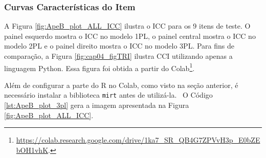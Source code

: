 \subsubsection{Curvas Características do Item}\label{sec:apeB_cci}

A Figura \ref{fig:ApeB_plot_ALL_ICC} ilustra o ICC para os 9 itens de teste. O painel esquerdo mostra o ICC no modelo 1PL, o painel central mostra o ICC no modelo 2PL e o painel direito mostra o ICC no modelo 3PL.  Para fins de comparação, a Figura \ref{fig:cap04_figTRI} ilustra CCI utilizando apenas a linguagem Python. Essa figura foi obtida a partir do Colab\footnote{\url{https://colab.research.google.com/drive/1ka7_SR_QB4G7ZPVvH3p_E0bZEbOH1vhK}.}.

Além de configurar a parte do R no Colab, como visto na seção anterior, é necessário instalar a biblioteca \verb|mirt| antes de utilizá-la. 
\
O Código \ref{lst:ApeB_plot_3pl} gera a imagem apresentada na Figura \ref{fig:ApeB_plot_ALL_ICC}. 

